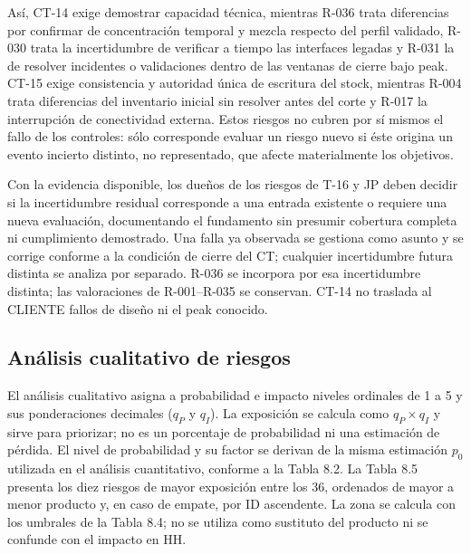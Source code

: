 Así, CT-14 exige demostrar capacidad técnica, mientras R-036 trata diferencias por confirmar de concentración temporal y mezcla respecto del perfil validado, R-030 trata la incertidumbre de verificar a tiempo las interfaces legadas y R-031 la de resolver incidentes o validaciones dentro de las ventanas de cierre bajo peak. CT-15 exige consistencia y autoridad única de escritura del stock, mientras R-004 trata diferencias del inventario inicial sin resolver antes del corte y R-017 la interrupción de conectividad externa. Estos riesgos no cubren por sí mismos el fallo de los controles: sólo corresponde evaluar un riesgo nuevo si éste origina un evento incierto distinto, no representado, que afecte materialmente los objetivos.

Con la evidencia disponible, los dueños de los riesgos de T-16 y JP deben decidir si la incertidumbre residual corresponde a una entrada existente o requiere una nueva evaluación, documentando el fundamento sin presumir cobertura completa ni cumplimiento demostrado. Una falla ya observada se gestiona como asunto y se corrige conforme a la condición de cierre del CT; cualquier incertidumbre futura distinta se analiza por separado. R-036 se incorpora por esa incertidumbre distinta; las valoraciones de R-001--R-035 se conservan. CT-14 no traslada al CLIENTE fallos de diseño ni el peak conocido.

\subsection{Análisis cualitativo de riesgos}

El análisis cualitativo asigna a probabilidad e impacto niveles ordinales de 1 a 5 y sus ponderaciones decimales ($q_P$ y $q_I$). La exposición se calcula como $q_P\times q_I$ y sirve para priorizar; no es un porcentaje de probabilidad ni una estimación de pérdida. El nivel de probabilidad y su factor se derivan de la misma estimación $p_0$ utilizada en el análisis cuantitativo, conforme a la Tabla 8.2. La Tabla 8.5 presenta los diez riesgos de mayor exposición entre los 36, ordenados de mayor a menor producto y, en caso de empate, por ID ascendente. La zona se calcula con los umbrales de la Tabla 8.4; no se utiliza como sustituto del producto ni se confunde con el impacto en HH.

